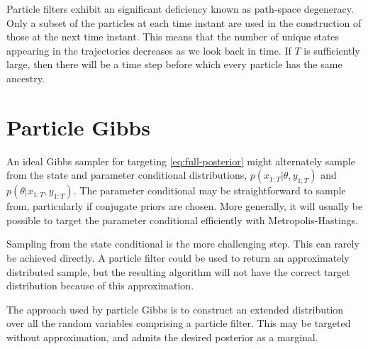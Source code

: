 \documentclass{article}
\newcommand{\timax}{T}
\newcommand{\pr}{\theta}
\newcommand{\ls}[1]{x_{#1}}
\newcommand{\ob}[1]{y_{#1}}
\newcommand{\den}{p}
\begin{document}
Particle filters exhibit an significant deficiency known as path-space degeneracy. Only a subset of the particles at each time instant are used in the construction of those at the next time instant. This means that the number of unique states appearing in the trajectories decreases as we look back in time. If $\timax$ is sufficiently large, then there will be a time step before which every particle has the same ancestry.



\section{Particle Gibbs}
An ideal Gibbs sampler for targeting \eqref{eq:full-posterior} might alternately sample from the state and parameter conditional distributions, $\den(\ls{1:\timax}|\pr,\ob{1:\timax})$ and $\den(\pr|\ls{1:\timax},\ob{1:\timax})$. The parameter conditional may be straightforward to sample from, particularly if conjugate priors are chosen. More generally, it will usually be possible to target the parameter conditional efficiently with Metropolis-Hastings.

Sampling from the state conditional is the more challenging step. This can rarely be achieved directly. A particle filter could be used to return an approximately distributed sample, but the resulting algorithm will not have the correct target distribution because of this approximation.

The approach used by particle Gibbs is to construct an extended distribution over all the random variables comprising a particle filter. This may be targeted without approximation, and admits the desired posterior as a marginal.
\end{document}
